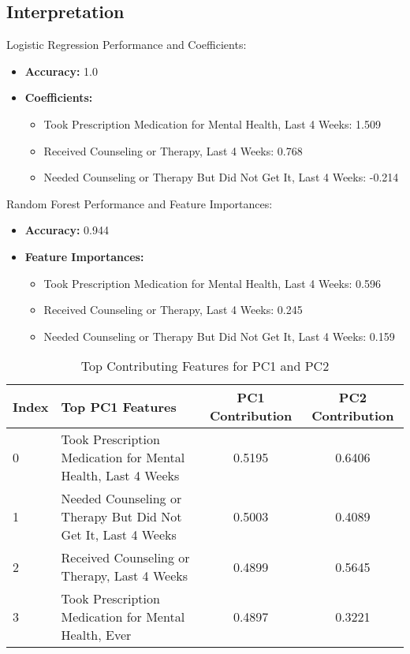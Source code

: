 \documentclass{article}
\begin{document}
\subsection{Interpretation}
Logistic Regression Performance and Coefficients:
\begin{itemize}
    \item \textbf{Accuracy:} 1.0
    \item \textbf{Coefficients:}
    \begin{itemize}
        \item Took Prescription Medication for Mental Health, Last 4 Weeks: 1.509
        \item Received Counseling or Therapy, Last 4 Weeks: 0.768
        \item Needed Counseling or Therapy But Did Not Get It, Last 4 Weeks: -0.214
    \end{itemize}
\end{itemize}

Random Forest Performance and Feature Importances:
\begin{itemize}
    \item \textbf{Accuracy:} 0.944
    \item \textbf{Feature Importances:}
    \begin{itemize}
        \item Took Prescription Medication for Mental Health, Last 4 Weeks: 0.596
        \item Received Counseling or Therapy, Last 4 Weeks: 0.245
        \item Needed Counseling or Therapy But Did Not Get It, Last 4 Weeks: 0.159
    \end{itemize}
\end{itemize}

\begin{table}[h!]
\centering
\begin{adjustbox}{max width=\textwidth}
\begin{tabular}{llcc}
\toprule
\textbf{Index} & \textbf{Top PC1 Features} & \textbf{PC1 Contribution} & \textbf{PC2 Contribution} \\
\midrule
0 & Took Prescription Medication for Mental Health, Last 4 Weeks & 0.5195 & 0.6406 \\
1 & Needed Counseling or Therapy But Did Not Get It, Last 4 Weeks & 0.5003 & 0.4089 \\
2 & Received Counseling or Therapy, Last 4 Weeks & 0.4899 & 0.5645 \\
3 & Took Prescription Medication for Mental Health, Ever & 0.4897 & 0.3221 \\
\bottomrule
\end{tabular}
\end{adjustbox}
\caption{Top Contributing Features for PC1 and PC2}
\end{table}
\end{document}
